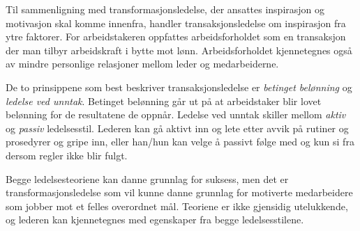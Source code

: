 \indent \newline
Til sammenligning med transformasjonsledelse, der ansattes inspirasjon og motivasjon skal komme innenfra, handler transaksjonsledelse om inspirasjon fra ytre faktorer. For arbeidstakeren oppfattes arbeidsforholdet som en transaksjon der man tilbyr arbeidskraft i bytte mot lønn. Arbeidsforholdet kjennetegnes også av mindre personlige relasjoner mellom leder og medarbeiderne.

\indent \newline
De to prinsippene som best beskriver transaksjonsledelse er \textit{betinget belønning} og \textit{ledelse ved unntak}. Betinget belønning går ut på at arbeidstaker blir lovet belønning for de resultatene de oppnår. Ledelse ved unntak skiller mellom \textit{aktiv} og \textit{passiv} ledelsesstil. Lederen kan gå aktivt inn og lete etter avvik på rutiner og prosedyrer og gripe inn, eller han/hun kan velge å passivt følge med og kun si fra dersom regler ikke blir fulgt. 

\indent \newline
Begge ledelsesteoriene kan danne grunnlag for suksess, men det er transformasjonsledelse som vil kunne danne grunnlag for motiverte medarbeidere som jobber mot et felles overordnet mål. Teoriene er ikke gjensidig utelukkende, og lederen kan kjennetegnes med egenskaper fra begge ledelsesstilene. 

